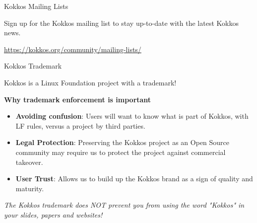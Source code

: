
\begin{frame}[fragile]{Kokkos Mailing Lists}

\vspace{0.5cm}
\begin{center}
Sign up for the Kokkos mailing list to stay up-to-date with the latest Kokkos news.
\end{center}

\vspace{0.5cm}

\begin{center}
\url{https://kokkos.org/community/mailing-lists/}
\end{center}

\end{frame}


\begin{frame}[fragile]{Kokkos Trademark}

Kokkos is a Linux Foundation project with a trademark!

\textbf{Why trademark enforcement is important}
\begin{itemize}
\item{\textbf{Avoiding confusion}: Users will want to know what is part of Kokkos, with LF rules, versus a project by third parties.}
\item{\textbf{Legal Protection}: Preserving the Kokkos project as an Open Source community may require us to protect the project against commercial takeover.}
\item{\textbf{User Trust}: Allows us to build up the Kokkos brand as a sign of quality and maturity.}
\end{itemize}

\begin{center}
\textit{The Kokkos trademark does NOT prevent you from using the word "Kokkos" in your slides, papers and websites!}
\end{center}

\end{frame}


